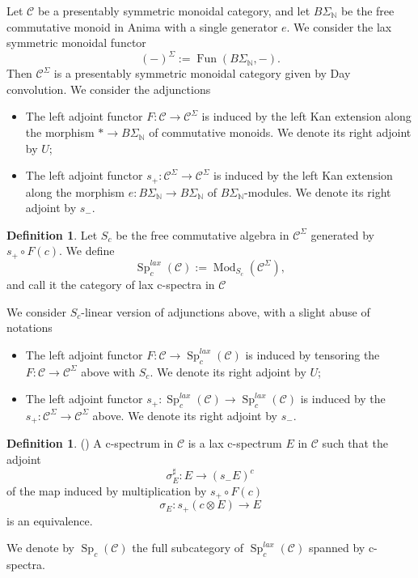 \documentclass{article}
\theoremstyle{definition}
\newtheorem{defn}[thm]{Definition}
\newcommand{\on}{\operatorname}
\begin{document}
Let $\mathcal{C}$ be a presentably symmetric monoidal category, and let $B\Sigma_{\mathbb{N}}$ be the free commutative monoid in Anima with a single generator $e$. We consider the lax symmetric monoidal functor
\[(-)^{\Sigma}:=\on{Fun}(B\Sigma_{\mathbb{N}},-).\]
Then $\mathcal{C}^{\Sigma}$ is a presentably symmetric monoidal category given by Day convolution. We consider the adjunctions
\begin{itemize}
\item The left adjoint functor $F: \mathcal{C}\rightarrow\mathcal{C}^{\Sigma}$ is induced by the left Kan extension along the morphism $\ast\rightarrow B\Sigma_{\mathbb{N}}$ of commutative monoids. We denote its right adjoint by $U$;
\item The left adjoint functor $s_+:\mathcal{C}^{\Sigma}\rightarrow\mathcal{C}^{\Sigma}$ is induced by the left Kan extension along the morphism $e:B\Sigma_{\mathbb{N}}\rightarrow B\Sigma_{\mathbb{N}}$ of $B\Sigma_{\mathbb{N}}$-modules. We denote its right adjoint by $s_-$.
\end{itemize}
\begin{defn}\label{lax.}
Let $S_c$ be the free commutative algebra in $\mathcal{C}^{\Sigma}$ generated by $s_+\circ F(c)$. We define\[
\on{Sp}^{lax}_c(\mathcal{C}):=\on{Mod}_{S_c}(\mathcal{C}^{\Sigma}),\]
and call it the category of lax c-spectra in $\mathcal{C}$
\end{defn}
We consider $S_c$-linear version of adjunctions above, with a slight abuse of notations
\begin{itemize}
\item The left adjoint functor $F: \mathcal{C}\rightarrow\on{Sp}^{lax}_c(\mathcal{C})$ is induced by tensoring the $F: \mathcal{C}\rightarrow\mathcal{C}^{\Sigma}$ above with $S_c$. We denote its right adjoint by $U$;
\item The left adjoint functor $s_+:\on{Sp}^{lax}_c(\mathcal{C})\rightarrow\on{Sp}^{lax}_c(\mathcal{C})$ is induced by the $s_+:\mathcal{C}^{\Sigma}\rightarrow\mathcal{C}^{\Sigma}$ above. We denote its right adjoint by $s_-$.
\end{itemize}
\begin{defn}(\cite[Lemma 1.3.6, Construction 1.3.7, Definition 1.3.8]{AI})
A c-spectrum in $\mathcal{C}$ is a lax c-spectrum $E$ in $\mathcal{C}$ such that the adjoint\[
\sigma_E^{\sharp}:E\rightarrow (s_-E)^c\]
of the map induced by multiplication by $s_+\circ F(c)$\[
\sigma_E:s_+(c\otimes E)\rightarrow E\]
is an equivalence.



We denote by $\on{Sp}_c(\mathcal{C})$ the full subcategory of $\on{Sp}^{lax}_c(\mathcal{C})$ spanned by c-spectra.
\end{defn}
\end{document}
